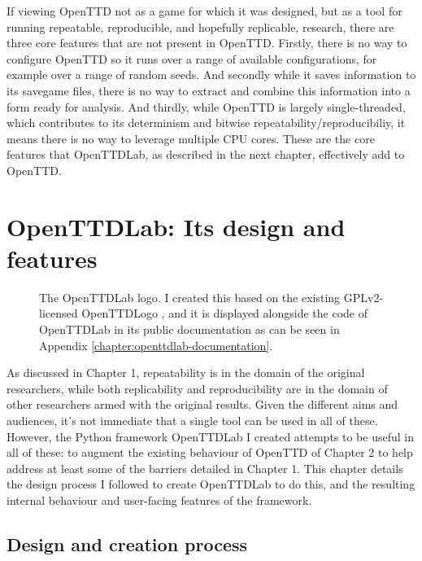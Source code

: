 \documentclass[logo,msc,dsti]{style/infthesis}    %
\begin{document}
{If viewing OpenTTD not as a game for which it was designed, but as a tool for running repeatable, reproducible, and hopefully replicable, research, there are three core features that are not present in OpenTTD. Firstly, there is no way to configure OpenTTD so it runs over a range of available configurations, for example over a range of random seeds. And secondly while it saves information to its savegame files, there is no way to extract and combine this information into a form ready for analysis. And thirdly, while OpenTTD is largely single-threaded, which contributes to its determinism and bitwise repeatability/reproducibiliy, it means there is no way to leverage multiple CPU cores. These are the core features that OpenTTDLab, as described in the next chapter, effectively add to OpenTTD.

\chapter{OpenTTDLab: Its design and features}
\label{chapter:openttdlab-design-process-and-features}

\begin{figure}[H]
\centering

\caption{The OpenTTDLab logo. I created this based on the existing GPLv2-licensed OpenTTDLogo \cite{OpenTTDLogo}, and it is displayed alongside the code of OpenTTDLab in its public documentation as can be seen in Appendix \ref{chapter:openttdlab-documentation}.}
\label{fig:openttlab-logo}
\end{figure}

As discussed in Chapter 1, repeatability is in the domain of the original researchers, while both replicability and reproducibility are in the domain of other researchers armed with the original results. Given the different aims and audiences, it's not immediate that a single tool can be used in all of these. However, the Python framework OpenTTDLab I created attempts to be useful in all of these: to augment the existing behaviour of OpenTTD of Chapter 2 to help address at least some of the barriers detailed in Chapter 1. This chapter details the design process I followed to create OpenTTDLab to do this, and the resulting internal behaviour and user-facing features of the framework.

\section{Design and creation process}

}
\end{document}
